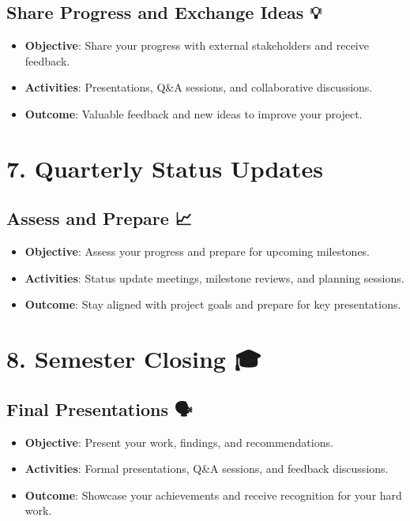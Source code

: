 \documentclass[
  letterpaper,
  DIV=11,
  numbers=noendperiod]{scrreprt}
\providecommand{\tightlist}{%
  \setlength{\itemsep}{0pt}\setlength{\parskip}{0pt}}\usepackage{longtable,booktabs,array}
\begin{document}
\subsection{Share Progress and Exchange Ideas
💡}\label{share-progress-and-exchange-ideas}

\begin{itemize}
\tightlist
\item
  \textbf{Objective}: Share your progress with external stakeholders and
  receive feedback.
\item
  \textbf{Activities}: Presentations, Q\&A sessions, and collaborative
  discussions.
\item
  \textbf{Outcome}: Valuable feedback and new ideas to improve your
  project.
\end{itemize}

\section{7. Quarterly Status Updates 📅}\label{quarterly-status-updates}

\subsection{Assess and Prepare 📈}\label{assess-and-prepare}

\begin{itemize}
\tightlist
\item
  \textbf{Objective}: Assess your progress and prepare for upcoming
  milestones.
\item
  \textbf{Activities}: Status update meetings, milestone reviews, and
  planning sessions.
\item
  \textbf{Outcome}: Stay aligned with project goals and prepare for key
  presentations.
\end{itemize}

\section{8. Semester Closing 🎓}\label{semester-closing}

\subsection{Final Presentations 🗣️}\label{final-presentations}

\begin{itemize}
\tightlist
\item
  \textbf{Objective}: Present your work, findings, and recommendations.
\item
  \textbf{Activities}: Formal presentations, Q\&A sessions, and feedback
  discussions.
\item
  \textbf{Outcome}: Showcase your achievements and receive recognition
  for your hard work.
\end{itemize}
\end{document}
